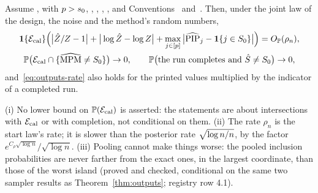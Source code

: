 \begin{theorem}\label{thm:outputs}
Assume ,  with $p>s_0$, , , , , and Conventions~ and~. Then,
under the joint law of the design, the noise and the method's random numbers,
\begin{gather}
  \mathbf{1}\{\mathcal E_{\mathrm{cal}}\}\Big(\big|\hat Z/Z-1\big|+\big|\log\hat Z-\log Z\big|+\max_{j\in[p]}\big|\widehat{\mathrm{PIP}}_j-\mathbf{1}\{j\in S_0\}\big|\Big)
    =O_{\mathbb{P}}(\rho_n),\label{eq:outputs-rate}\\
  \mathbb{P}\big(\mathcal E_{\mathrm{cal}}\cap\{\widehat{\mathrm{MPM}}\neq S_0\}\big)\to0,\qquad \mathbb{P}\big(\text{the run completes and }\hat S\neq S_0\big)\to0,
    \label{eq:outputs-sel}
\end{gather}
and~\eqref{eq:outputs-rate} also holds for the printed values multiplied by the indicator of a completed run.
\end{theorem}



\begin{remark}\label{rem:outputs}
(i) No lower bound on $\mathbb{P}(\mathcal E_{\mathrm{cal}})$ is asserted: the statements are about intersections with $\mathcal E_{\mathrm{cal}}$ or with completion, not
conditional on them.
(ii) The rate $\rho_n$ is the start law's rate; it is slower than the posterior rate $\sqrt{\log n/n}$, by the factor
$e^{C_\rho\sqrt{\log n}}/\sqrt{\log n}$.
(iii) Pooling cannot make things worse: the pooled inclusion probabilities are never farther from the exact ones, in the
largest coordinate, than those of the worst island (proved and checked, conditional on the same two sampler results as
Theorem~\ref{thm:outputs}; registry row 4.1).
\end{remark}
